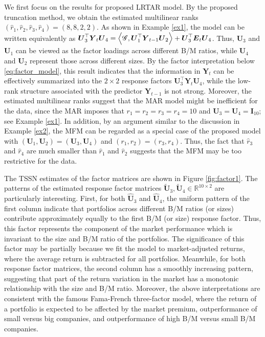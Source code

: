 \documentclass[12pt]{article}
\newcommand{\bm}{\boldsymbol}
\newcommand{\cm}[1]{\mbox{\boldmath$\mathscr{#1}$}}
\begin{document}
We first focus on the results for proposed LRTAR model. By the proposed truncation method, we obtain the estimated multilinear ranks  $(\widehat{r}_1,\widehat{r}_2,\widehat{r}_3,\widehat{r}_4)=(8,8,2,2)$. As shown in  Example \ref{ex1}, the model can be written equivalently  as $\bm{U}_{3}^\top\bm{Y}_t\bm{U}_{4} =\left \langle\cm{G},\bm{U}_{1}^\top\bm{Y}_{t-1}\bm{U}_{2}\right \rangle+\bm{U}_{3}^\top\bm{E}_t\bm{U}_{4}$.  Thus, $\bm{U}_3$ and $\bm{U}_1$ can be viewed as the factor loadings across different B/M ratios, while $\bm{U}_4$ and $\bm{U}_2$ represent those across different sizes. By the factor interpretation below \eqref{eq:factor_model}, this result indicates that the information in $\bm{Y}_{t}$ can be effectively summarized into the $2\times 2$ response factors $\bm{U}_{3}^\top\bm{Y}_t\bm{U}_{4}$, while the low-rank structure associated with the predictor $\bm{Y}_{t-1}$ is not strong.  Moreover, the estimated multilinear ranks suggest that the MAR model might be inefficient for  the data, since  the MAR imposes that $r_1=r_2=r_3=r_4=10$ and $\bm{U}_{3}=\bm{U}_{4}=\bm{I}_{10}$; see Example \ref{ex1}. In addition, by an argument similar to the discussion in Example \ref{ex2}, the MFM can be regarded as a special case of the proposed model with $(\bm{U}_{1}, \bm{U}_2)=(\bm{U}_{3}, \bm{U}_4)$ and $(r_1, r_2)=(r_3, r_4)$.  Thus, the fact that $\widehat{r}_3$ and $\widehat{r}_4$ are much smaller than $\widehat{r}_1$ and $\widehat{r}_2$ suggests that the MFM may be too restrictive for the data.

The TSSN estimates of the factor matrices are shown in Figure \ref{fig:factor1}. The patterns of the estimated response factor matrices $\bm{\widetilde{U}}_3, \bm{\widetilde{U}}_4 \in \mathbb{R}^{10\times 2}$   are particularly interesting.  First, for both  $\bm{\widehat{U}}_3$ and $\bm{\widehat{U}}_4$, the uniform pattern of the first column indicate that portfolios across different B/M ratios (or sizes) contribute approximately equally to the first B/M (or size) response factor. Thus, this factor represents the component of the market performance which is invariant  to the size and B/M ratio of the portfolios. The significance of this factor may be partially because we fit the model to  market-adjusted returns, where the average return is subtracted for all portfolios.  Meanwhile, for both response factor matrices, the second column has a smoothly increasing pattern, suggesting that part of the return variation in the market has a monotonic relationship with the size and B/M ratio. Moreover, the above interpretations are consistent with the famous Fama-French three-factor model, where the return of a portfolio is expected to be affected by the  market premium, outperformance of small versus big companies, and outperformance of high B/M versus small B/M companies.
\end{document}
